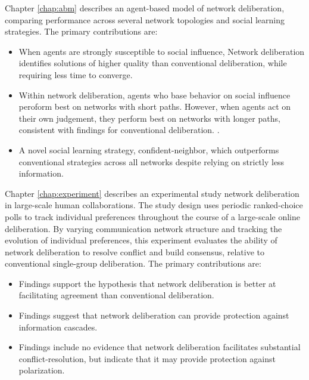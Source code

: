 Chapter \ref{chap:abm} describes an agent-based model of network deliberation,
comparing performance across several network topologies and social learning
strategies.
The primary contributions are:
\begin{itemize}
\setlength\itemsep{0pt}
\item When agents are strongly susceptible to social influence,
Network deliberation identifies solutions of higher quality than
conventional deliberation,
while requiring less time to converge.
\item Within network deliberation,
agents who base behavior on social influence peroform best on networks with short paths.
However, when agents act on their own judgement,
they perform best on networks with longer paths,
consistent with findings for conventional deliberation.
\cite{barkoczi_social_2016}.
\item A novel social learning strategy, confident-neighbor,
which outperforms conventional strategies across all
networks despite relying on strictly less information.
\end{itemize}

Chapter \ref{chap:experiment} describes an experimental study network deliberation in large-scale human collaborations.
The study design uses periodic ranked-choice polls to track individual preferences
throughout the course of a large-scale online deliberation.
By varying communication network structure and tracking the evolution of individual
preferences,
this experiment evaluates the ability of network deliberation to resolve conflict
and build consensus, relative to conventional single-group deliberation.
The primary contributions are:
\begin{itemize}
\setlength\itemsep{0pt}
    \item Findings support the hypothesis that network deliberation is better at facilitating agreement than conventional deliberation.
    \item Findings suggest that network deliberation can provide protection against information cascades.
    \item Findings include no evidence that network deliberation facilitates substantial conflict-resolution, but indicate that it may provide protection against polarization.
\end{itemize}

